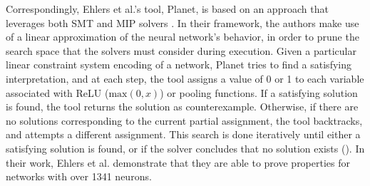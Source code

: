 \documentclass[10pt,conference]{IEEEtran}
\begin{document}
Correspondingly, Ehlers et al.'s tool, Planet, is based on an approach that leverages both SMT and MIP solvers \cite{EhlersFormal2018}. In their framework, the authors make use of a linear approximation of the neural network's behavior, in order to prune the search space that the solvers must consider during execution. Given a particular linear constraint system encoding of a network, Planet tries to find a satisfying interpretation, and at each step, the tool assigns a value of 0 or 1 to each variable associated with ReLU ($\textrm{max}(0,x)$) or pooling functions. If a satisfying solution is found, the tool returns the solution as counterexample. Otherwise, if there are no solutions corresponding to the current partial assignment, the tool backtracks, and attempts a different assignment. This search is done iteratively until either a satisfying solution is found, or if the solver concludes that no solution exists (\cite{EhlersFormal2018, KatzLecture_2018}). In their work, Ehlers et al. demonstrate that they are able to prove properties for networks with over 1341 neurons.
\end{document}
